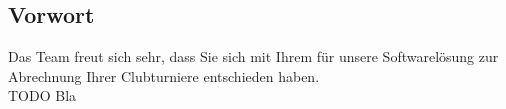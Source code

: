 \subsection{Vorwort}
Das \bb Team freut sich sehr, dass Sie sich mit Ihrem \bc für unsere Softwarelösung zur Abrechnung Ihrer Clubturniere entschieden haben.\\[.1cm]
TODO Bla
